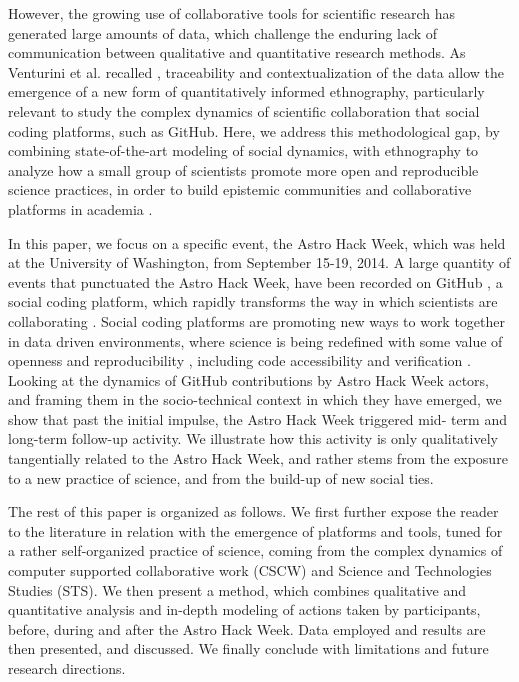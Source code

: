 However, the growing use of collaborative tools for scientific research has generated large amounts of data, which challenge the enduring lack of communication between qualitative and quantitative research methods.  As Venturini et al. recalled \cite{venturini2015fill}, traceability and contextualization of the data allow the emergence of a new form of quantitatively informed ethnography, particularly relevant to study the complex dynamics of scientific collaboration that social coding platforms, such as GitHub. Here, we address this methodological gap, by combining state-of-the-art modeling of social dynamics, with ethnography to analyze how a small group of scientists promote more open and reproducible science practices, in order to build epistemic communities and collaborative platforms in academia \cite{calvert2013collaboration}.

In this paper, we focus on a specific event, the Astro Hack Week, which was held at the University of Washington, from September 15-19, 2014. A large quantity of events that punctuated the Astro Hack Week, have been recorded on GitHub \cite{github}, a social coding platform, which rapidly transforms the way in which scientists are collaborating \cite{gerson2013integration}. Social coding platforms are promoting new ways to work together in data driven environments, where science is being redefined with some value of openness and reproducibility \cite{ducheneaut2005socialization}, including code accessibility and verification \cite{hayden2015rule,proebsting2015repeatability}. Looking at the dynamics of GitHub contributions by Astro Hack Week actors, and framing them in the socio-technical context in which they have emerged, we show that past the initial impulse, the Astro Hack Week triggered mid- term and long-term follow-up activity. We illustrate how this activity is only qualitatively tangentially related to the Astro Hack Week, and rather stems from the exposure to a new practice of science, and from the build-up of new social ties.

The rest of this paper is organized as follows. We first further expose the reader to the literature in relation with the emergence of platforms and tools, tuned for a rather self-organized practice of science, coming from the complex dynamics of computer supported collaborative work (CSCW) and Science and Technologies Studies (STS). We then present a method, which combines qualitative and quantitative analysis and in-depth modeling of actions taken by participants, before, during and after the Astro Hack Week. Data employed and results are then presented, and discussed. We finally conclude with limitations and future research directions.

